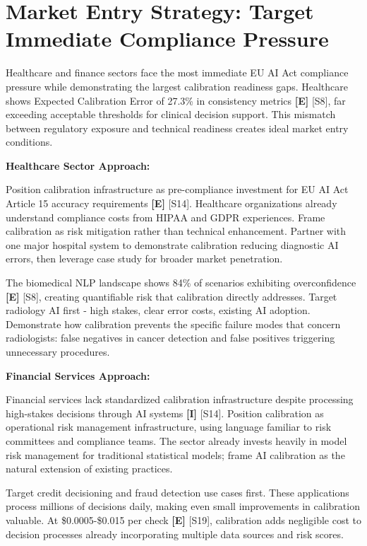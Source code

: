 \documentclass[a4paper,11pt]{article}
\newcommand{\elabel}{\textbf{\textcolor{ecolor}{[E]}}}
\newcommand{\ilabel}{\textbf{\textcolor{icolor}{[I]}}}
\begin{document}
\section{Market Entry Strategy: Target Immediate Compliance Pressure}

Healthcare and finance sectors face the most immediate EU AI Act compliance pressure while demonstrating the largest calibration readiness gaps. Healthcare shows Expected Calibration Error of 27.3\% in consistency metrics \elabel{} \textcolor{primary}{[S8]}, far exceeding acceptable thresholds for clinical decision support. This mismatch between regulatory exposure and technical readiness creates ideal market entry conditions.


\textbf{Healthcare Sector Approach:}\par
Position calibration infrastructure as pre-compliance investment for EU AI Act Article 15 accuracy requirements \elabel{} \textcolor{primary}{[S14]}. Healthcare organizations already understand compliance costs from HIPAA and GDPR experiences. Frame calibration as risk mitigation rather than technical enhancement. Partner with one major hospital system to demonstrate calibration reducing diagnostic AI errors, then leverage case study for broader market penetration.


The biomedical NLP landscape shows 84\% of scenarios exhibiting overconfidence \elabel{} \textcolor{primary}{[S8]}, creating quantifiable risk that calibration directly addresses. Target radiology AI first - high stakes, clear error costs, existing AI adoption. Demonstrate how calibration prevents the specific failure modes that concern radiologists: false negatives in cancer detection and false positives triggering unnecessary procedures.


\textbf{Financial Services Approach:}\par
Financial services lack standardized calibration infrastructure despite processing high-stakes decisions through AI systems \ilabel{} \textcolor{primary}{[S14]}. Position calibration as operational risk management infrastructure, using language familiar to risk committees and compliance teams. The sector already invests heavily in model risk management for traditional statistical models; frame AI calibration as the natural extension of existing practices.


Target credit decisioning and fraud detection use cases first. These applications process millions of decisions daily, making even small improvements in calibration valuable. At \$0.0005-\$0.015 per check \elabel{} \textcolor{primary}{[S19]}, calibration adds negligible cost to decision processes already incorporating multiple data sources and risk scores.
\end{document}
